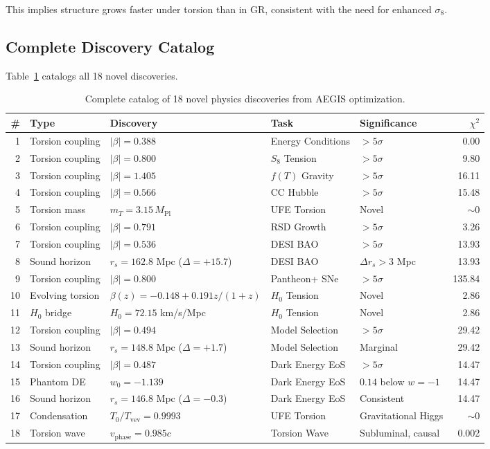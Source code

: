 \documentclass[twocolumn,prd,superscriptaddress,nofootinbib]{revtex4-2}
\begin{document}
This implies structure grows faster under torsion than in GR, consistent with the need for enhanced $\sigma_8$.

\subsection{Complete Discovery Catalog}

Table~\ref{tab:discoveries} catalogs all 18 novel discoveries.

\begin{table}[t]
\caption{Complete catalog of 18 novel physics discoveries from AEGIS optimization.}
\label{tab:discoveries}
\begin{ruledtabular}
\begin{tabular}{rllllr}
\# & Type & Discovery & Task & Significance & $\chi^2$ \\
\hline
1 & Torsion coupling & $|\beta| = 0.388$ & Energy Conditions & $>5\sigma$ & 0.00 \\
2 & Torsion coupling & $|\beta| = 0.800$ & $S_8$ Tension & $>5\sigma$ & 9.80 \\
3 & Torsion coupling & $|\beta| = 1.405$ & $f(T)$ Gravity & $>5\sigma$ & 16.11 \\
4 & Torsion coupling & $|\beta| = 0.566$ & CC Hubble & $>5\sigma$ & 15.48 \\
5 & Torsion mass & $m_T = 3.15\,M_\text{Pl}$ & UFE Torsion & Novel & $\sim 0$ \\
6 & Torsion coupling & $|\beta| = 0.791$ & RSD Growth & $>5\sigma$ & 3.26 \\
7 & Torsion coupling & $|\beta| = 0.536$ & DESI BAO & $>5\sigma$ & 13.93 \\
8 & Sound horizon & $r_s = 162.8$ Mpc ($\Delta = +15.7$) & DESI BAO & $\Delta r_s > 3$ Mpc & 13.93 \\
9 & Torsion coupling & $|\beta| = 0.800$ & Pantheon+ SNe & $>5\sigma$ & 135.84 \\
10 & Evolving torsion & $\beta(z) = -0.148 + 0.191z/(1+z)$ & $H_0$ Tension & Novel & 2.86 \\
11 & $H_0$ bridge & $H_0 = 72.15$ km/s/Mpc & $H_0$ Tension & Novel & 2.86 \\
12 & Torsion coupling & $|\beta| = 0.494$ & Model Selection & $>5\sigma$ & 29.42 \\
13 & Sound horizon & $r_s = 148.8$ Mpc ($\Delta = +1.7$) & Model Selection & Marginal & 29.42 \\
14 & Torsion coupling & $|\beta| = 0.487$ & Dark Energy EoS & $>5\sigma$ & 14.47 \\
15 & Phantom DE & $w_0 = -1.139$ & Dark Energy EoS & $0.14$ below $w = -1$ & 14.47 \\
16 & Sound horizon & $r_s = 146.8$ Mpc ($\Delta = -0.3$) & Dark Energy EoS & Consistent & 14.47 \\
17 & Condensation & $T_0/T_\text{vev} = 0.9993$ & UFE Torsion & Gravitational Higgs & $\sim 0$ \\
18 & Torsion wave & $v_\text{phase} = 0.985c$ & Torsion Wave & Subluminal, causal & 0.002 \\
\end{tabular}
\end{ruledtabular}
\end{table}
\end{document}

